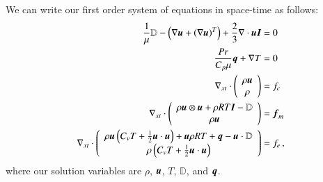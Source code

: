 \documentclass[preprint,12pt]{elsarticle}
\begin{document}
We can write our first order system of equations in space-time as follows:
\begin{subequations}
\label{eq:compressibleNSFirstOrder}
\begin{align}
	\frac{1}{\mu}\mathbb{D}-\left( \nabla\boldsymbol u+\left( \nabla\boldsymbol u \right)^T \right)+\frac{2}{3}\nabla\cdot\boldsymbol u\boldsymbol I&=0\\
	\frac{Pr}{C_p\mu}\boldsymbol q+\nabla T&=0\\
	\nabla_{xt}\cdot\left( \begin{array}{c} \rho\boldsymbol u\\ \rho\\ \end{array} \right)&=f_c\\
	\nabla_{xt}\cdot\left( \begin{array}{c} \rho\boldsymbol u\otimes\boldsymbol u+\rho RT\boldsymbol I-\mathbb{D}\\ \rho\boldsymbol u\\ \end{array} \right)&=\boldsymbol f_m\\
	\nabla_{xt}\cdot\left( \begin{array}{c} \rho\boldsymbol u\left( C_v T+\frac{1}{2}\boldsymbol u\cdot\boldsymbol u \right)+\boldsymbol u\rho RT+\boldsymbol q-\boldsymbol u\cdot\mathbb{D}\\ \rho\left( C_v T+\frac{1}{2}\boldsymbol u\cdot\boldsymbol u \right)\\ \end{array} \right)&=f_e\,,
\end{align}
\end{subequations}
where our solution variables are $\rho$, $\boldsymbol u$, $T$, $\mathbb{D}$, and $\boldsymbol q$.

%                                                                                           
%                                                                                           
%              
\end{document}
